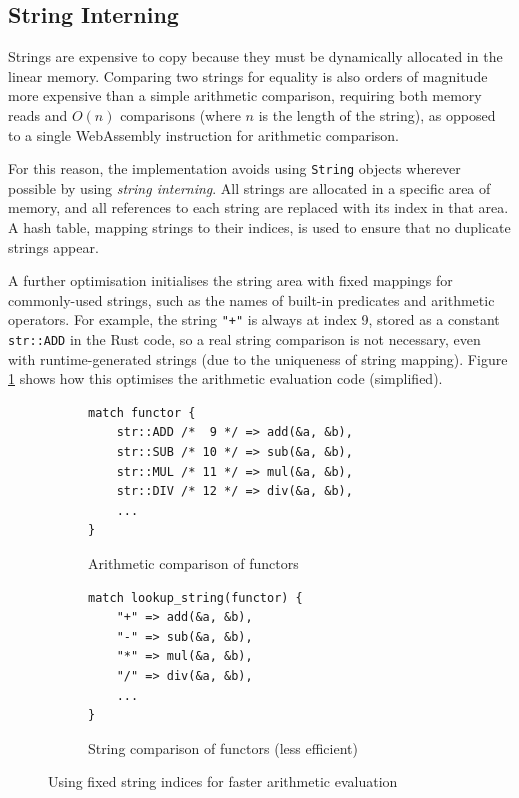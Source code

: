\subsection{String Interning}

Strings are expensive to copy because they must be dynamically allocated in the linear memory. Comparing two strings for equality is also orders of magnitude more expensive than a simple arithmetic comparison, requiring both memory reads and $O(n)$ comparisons (where $n$ is the length of the string), as opposed to a single WebAssembly instruction for arithmetic comparison.

For this reason, the implementation avoids using \texttt{String} objects wherever possible by using \emph{string interning}. All strings are allocated in a specific area of memory, and all references to each string are replaced with its index in that area. A hash table, mapping strings to their indices, is used to ensure that no duplicate strings appear.

A further optimisation initialises the string area with fixed mappings for commonly-used strings, such as the names of built-in predicates and arithmetic operators. For example, the string \texttt{"+"} is always at index 9, stored as a constant \texttt{str::ADD} in the Rust code, so a real string comparison is not necessary, even with runtime-generated strings (due to the uniqueness of string mapping). Figure \ref{fig:fixed-string-indices} shows how this optimises the arithmetic evaluation code (simplified).

\begin{figure}[H]
\centering
\begin{subfigure}{.5\textwidth}
\centering
\begin{verbatim}
match functor {
    str::ADD /*  9 */ => add(&a, &b),
    str::SUB /* 10 */ => sub(&a, &b),
    str::MUL /* 11 */ => mul(&a, &b),
    str::DIV /* 12 */ => div(&a, &b),
    ...
}
\end{verbatim}
\caption{Arithmetic comparison of functors}
\end{subfigure}%
\begin{subfigure}{.5\textwidth}
\centering
\begin{verbatim}
match lookup_string(functor) {
    "+" => add(&a, &b),
    "-" => sub(&a, &b),
    "*" => mul(&a, &b),
    "/" => div(&a, &b),
    ...
}
\end{verbatim}
\caption{String comparison of functors (less efficient)}
\end{subfigure}
\caption{Using fixed string indices for faster arithmetic evaluation}
\label{fig:fixed-string-indices}
\end{figure}

